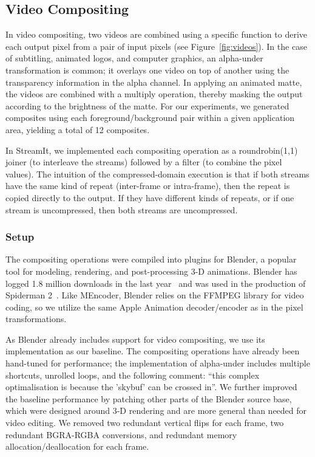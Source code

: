 \subsection{Video Compositing}

In video compositing, two videos are combined using a specific
function to derive each output pixel from a pair of input pixels (see
Figure~\ref{fig:videos}).  In the case of subtitling, animated logos,
and computer graphics, an alpha-under transformation is common; it
overlays one video on top of another using the transparency
information in the alpha channel.  In applying an animated matte, the
videos are combined with a multiply operation, thereby masking the
output according to the brightness of the matte.  For our experiments,
we generated composites using each foreground/background pair within a
given application area, yielding a total of 12 composites.

In StreamIt, we implemented each compositing operation as a
roundrobin(1,1) joiner (to interleave the streams) followed by a
filter (to combine the pixel values).  The intuition of the
compressed-domain execution is that if both streams have the same kind
of repeat (inter-frame or intra-frame), then the repeat is copied
directly to the output.  If they have different kinds of repeats, or
if one stream is uncompressed, then both streams are uncompressed.

\subsubsection{Setup}

The compositing operations were compiled into plugins for Blender, a
popular tool for modeling, rendering, and post-processing 3-D
animations.  Blender has logged 1.8 million downloads in the last
year~\cite{blender-stats} and was used in the production of Spiderman
2~\cite{blender-wikipedia}.  Like MEncoder, Blender relies on the
FFMPEG library for video coding, so we utilize the same Apple
Animation decoder/encoder as in the pixel transformations.

As Blender already includes support for video compositing, we use its
implementation as our baseline.  The compositing operations have
already been hand-tuned for performance; the implementation of
alpha-under includes multiple shortcuts, unrolled loops, and the
following comment: ``this complex optimalisation is because the
'skybuf' can be crossed in''.  We further improved the baseline
performance by patching other parts of the Blender source base, which
were designed around 3-D rendering and are more general than needed
for video editing.  We removed two redundant vertical flips for each
frame, two redundant BGRA-RGBA conversions, and redundant memory
allocation/deallocation for each frame.

